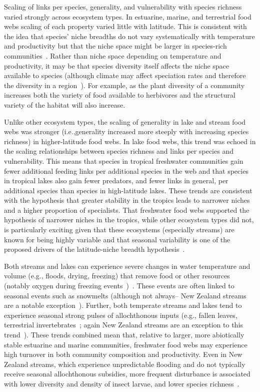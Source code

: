 \documentclass[12pt]{article}
\begin{document}
  Scaling of links per species, generality, and vulnerability with species
  richness varied strongly across ecosystem types. In estuarine, marine, and
  terrestrial food webs scaling of each property varied little with latitude.
  This is consistent with the idea that species' niche breadths do not vary
  systematically with temperature and productivity but that the niche space
  might be larger in species-rich communities~\cite{Davies2007}. Rather than
  niche space depending on temperature and productivity, it may be that species
  diversity itself affects the niche space available to species (although climate
  may affect speciation rates and therefore the diversity in a region~\cite{Currie2004}). 
  For example, as the plant diversity of a community increases both the 
  variety of food available to herbivores and the structural variety of the habitat will also increase.


  Unlike other ecosystem types, the scaling of generality in lake and stream
  food webs was stronger (i.e.,generality increased more steeply with
  increasing species richness) in higher-latitude food webs. In lake food webs,
  this trend was echoed in the scaling relationships between species richness
  and links per species and vulnerability. This means that species in tropical
  freshwater communities gain fewer additional feeding links per additional
  species in the web and that species in tropical lakes also gain fewer
  predators, and fewer links in general, per additional species than species
  in high-latitude lakes. These trends are consistent with the hypothesis that
  greater stability in the tropics leads to narrower niches~\cite{Vazquez2004}
  and a higher proportion of specialists. That freshwater food webs supported
  the hypothesis of narrower niches in the tropics, while other ecosystem types
  did not, is particularly exciting given that these ecosystems (especially streams)
  are known for being highly variable and that seasonal variability is one of the
  proposed drivers of the latitude-niche breadth hypothesis~\cite{Vazquez2004}.


  Both streams and lakes can experience severe changes in water temperature and volume
  (e.g., floods, drying, freezing) that remove food or other resources (notably oxygen
  during freezing events~\cite{})~\cite{Winterbourn1997, one for lakes}. These events
  are often linked to seasonal events such as snowmelts (although not always-- New Zealand
  streams are a notable exception~\cite{Winterbourn1997}). Further, both temperate streams 
  and lakes tend to experience seasonal strong pulses of allochthonous inputs (e.g., fallen leaves, 
  terrestrial invertebrates~\cite{Nakano2001,Zeng2008,}; again New Zealand streams are an
  exception to this trend~\cite{Winterbourn1997}). These trends combined mean that,
  relative to larger, more abiotically stable estuarine and marine communities, freshwater
  food webs may experience high turnover in both community composition and productivity.
  Even in New Zealand streams, which experience unpredictable flooding and do not typically
  receive seasonal allochthonous subsidies, more frequent disturbance is associated with lower
  diversity and density of insect larvae, and lower species richness~\cite{Winterbourn1997}.
\end{document}
